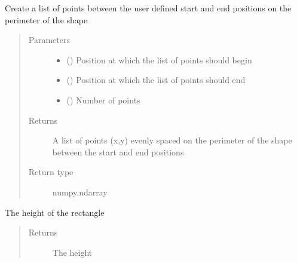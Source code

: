 \documentclass[letterpaper,10pt,english]{sphinxmanual}
\begin{document}
\begin{fulllineitems}
\begin{fulllineitems}
\end{fulllineitems}


\begin{fulllineitems}
\label{\detokenize{source/pyzones:pyzones.Rectangle.get_perimeter}}
Create a list of points between the user defined start and end positions on the perimeter of the shape
\begin{quote}\begin{description}
\item[{Parameters}] \leavevmode\begin{itemize}
\item {} 
 () \textendash{} Position at which the list of points should begin

\item {} 
 () \textendash{} Position at which the list of points should end

\item {} 
 () \textendash{} Number of points

\end{itemize}

\item[{Returns}] \leavevmode
A list of points (x,y) evenly spaced on the perimeter of the shape between the start and end positions

\item[{Return type}] \leavevmode
numpy.ndarray

\end{description}\end{quote}

\end{fulllineitems}


\begin{fulllineitems}
\label{\detokenize{source/pyzones:pyzones.Rectangle.height}}
The height of the rectangle
\begin{quote}\begin{description}
\item[{Returns}] \leavevmode
The height


\end{description}
\end{quote}
\end{fulllineitems}
\end{fulllineitems}
\end{document}
